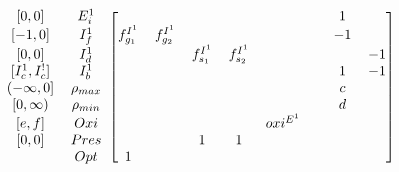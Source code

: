 \documentclass{beamer}
\begin{document}
\begin{frame}[shrink=25]
\begin{equation*}
\begin{blockarray}{cccccccccc}
\begin{block}{cc[cccccccc]}
            {[0,0]}            & E_{i}^{1}         &                   &
                               &                   &                   &
                               &                   & 1                 &
             \\
            {[-1,0]}           & I_{f}^{1}         & f_{g_{1}}^{I^{1}} &
            f_{g_{2}}^{I^{1}}  &                   &                   &
                               &                   & -1                &
             \\
            {[0,0]}            & I_{d}^{1}         &                   &
                               & f_{s_{1}}^{I^{1}} & f_{s_{2}}^{I^{1}} &
                               &                   &                   &
            -1 \\
            {[I_{c}^{1},I_{c}^{!}]}
                               & I_{b}^{1}         &                   &
                               &                   &                   &
                               &                   & 1                 &
            -1 \\ 
            {(-\infty,0]}      & \rho_{max}        &                   &
                               &                   &                   &
                               &                   & c                 &
             \\
            {[0,\infty)}       & \rho_{min}        &                   &
                               &                   &                   &
                               &                   & d                 & 
             \\
            {[e,f]}            & Oxi               &                   &
                               &                   &                   &
             oxi^{E^{1}}       &                   &                   &
             \\
            {[0,0]}            & Pres              &                   &
                               & 1                 & 1                 &
                               &                   &                   &
             \\
                               & Opt               & 1                 &
                               &                   &                   &
                               &                   &                   &
             \\
            \end{block}
        \end{blockarray}
    \end{equation*}

\end{frame}
\end{document}
